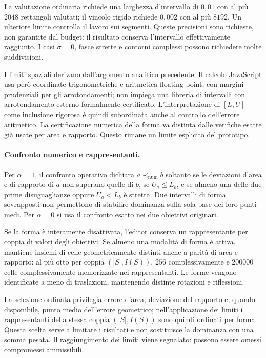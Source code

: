 \documentclass[11pt,a4paper]{article}
\begin{document}
La valutazione ordinaria richiede una larghezza d'intervallo di $0{,}01$ con al più $2048$ rettangoli valutati; il vincolo rigido richiede $0{,}002$ con al più $8192$. Un ulteriore limite controlla il lavoro sui segmenti. Queste precisioni sono richieste, non garantite dal budget: il risultato conserva l'intervallo effettivamente raggiunto. I casi $\sigma=0$, fasce strette e contorni complessi possono richiedere molte suddivisioni.

I limiti spaziali derivano dall'argomento analitico precedente. Il calcolo JavaScript usa però coordinate trigonometriche e aritmetica floating-point, con margini prudenziali per gli arrotondamenti; non impiega una libreria di intervalli con arrotondamento esterno formalmente certificato. L'interpretazione di $[L,U]$ come inclusione rigorosa è quindi subordinata anche al controllo dell'errore aritmetico. La certificazione numerica della forma va distinta dalle verifiche esatte già usate per area e rapporto. Questo rimane un limite esplicito del prototipo.

\paragraph{Confronto numerico e rappresentanti.}
Per $\alpha=1$, il confronto operativo dichiara $a\prec_{\mathrm{num}}b$ soltanto se le deviazioni d'area e di rapporto di $a$ non superano quelle di $b$, se $U_a\leq L_b$, e se almeno una delle due prime disuguaglianze oppure $U_a<L_b$ è stretta. Due intervalli di forma sovrapposti non permettono di stabilire dominanza sulla sola base dei loro punti medi. Per $\alpha=0$ si usa il confronto esatto nei due obiettivi originari.

Se la forma è interamente disattivata, l'editor conserva un rappresentante per coppia di valori degli obiettivi. Se almeno una modalità di forma è attiva, mantiene insiemi di celle geometricamente distinti anche a parità di area e rapporto: al più otto per coppia $(|S|,I(S))$, $256$ complessivamente e $200000$ celle complessivamente memorizzate nei rappresentanti. Le forme vengono identificate a meno di traslazioni, mantenendo distinte rotazioni e riflessioni.

La selezione ordinata privilegia errore d'area, deviazione del rapporto e, quando disponibile, punto medio dell'errore geometrico; nell'applicazione dei limiti i rappresentanti della stessa coppia $(|S|,I(S))$ sono quindi ordinati per forma. Questa scelta serve a limitare i risultati e non sostituisce la dominanza con una somma pesata. Il raggiungimento dei limiti viene segnalato: possono essere omessi compromessi ammissibili.
\end{document}
